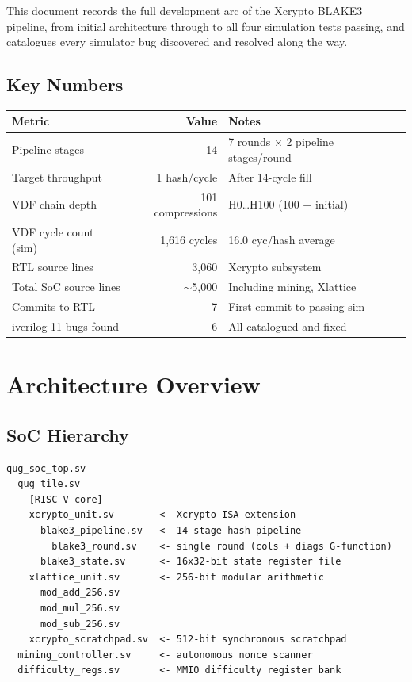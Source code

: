 \documentclass[11pt,a4paper]{article}
\begin{document}
This document records the full development arc of the Xcrypto BLAKE3 pipeline,
from initial architecture through to all four simulation tests passing, and
catalogues every simulator bug discovered and resolved along the way.

\subsection*{Key Numbers}

\begin{center}
\begin{tabular}{lrl}
\toprule
\textbf{Metric} & \textbf{Value} & \textbf{Notes} \\
\midrule
Pipeline stages & 14 & 7 rounds $\times$ 2 pipeline stages/round \\
Target throughput & 1 hash/cycle & After 14-cycle fill \\
VDF chain depth & 101 compressions & H0\ldots H100 (100 + initial) \\
VDF cycle count (sim) & 1{,}616 cycles & 16.0 cyc/hash average \\
RTL source lines & 3{,}060 & Xcrypto subsystem \\
Total SoC source lines & $\sim$5{,}000 & Including mining, Xlattice \\
Commits to RTL & 7 & First commit to passing sim \\
iverilog 11 bugs found & 6 & All catalogued and fixed \\
\bottomrule
\end{tabular}
\end{center}

\section{Architecture Overview}

\subsection{SoC Hierarchy}

\begin{verbatim}
qug_soc_top.sv
  qug_tile.sv
    [RISC-V core]
    xcrypto_unit.sv        <- Xcrypto ISA extension
      blake3_pipeline.sv   <- 14-stage hash pipeline
        blake3_round.sv    <- single round (cols + diags G-function)
      blake3_state.sv      <- 16x32-bit state register file
    xlattice_unit.sv       <- 256-bit modular arithmetic
      mod_add_256.sv
      mod_mul_256.sv
      mod_sub_256.sv
    xcrypto_scratchpad.sv  <- 512-bit synchronous scratchpad
  mining_controller.sv     <- autonomous nonce scanner
  difficulty_regs.sv       <- MMIO difficulty register bank
\end{verbatim}
\end{document}
